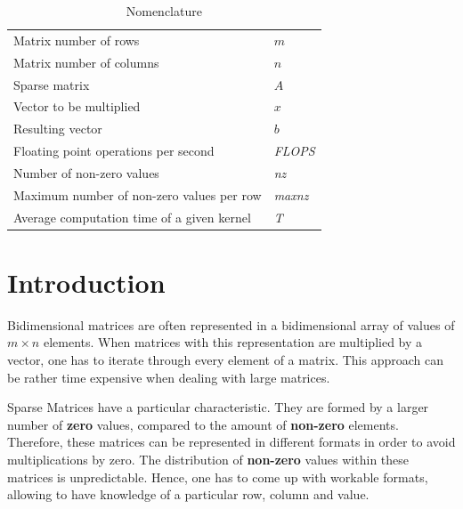 \documentclass[12pt]{article}
\begin{document}

\begin{table}[tb]
\caption{Nomenclature}
\label{tab:notation}
\centering
\def\arraystretch{1.5}
\begin{tabular}{ll}
Matrix number of rows & $m$\\
Matrix number of columns & $n$\\
Sparse matrix & $A$\\
Vector to be multiplied & $x$\\
Resulting vector & $b$\\
Floating point operations per second & \textit{FLOPS} \\
Number of non-zero values & \textit{nz} \\
Maximum number of non-zero values per row & \textit{maxnz} \\
Average computation time of a given kernel & \textit{T} \\
\end{tabular}
\end{table}


\section*{Introduction}

\par Bidimensional matrices are often represented in a bidimensional array of values of $m \times n$ elements. When matrices with this representation are multiplied by a vector, one has to iterate through every element of a matrix. This approach can be rather time expensive when dealing with large matrices.
\par Sparse Matrices have a particular characteristic. They are formed by a larger number of \textbf{zero} values, compared to the amount of \textbf{non-zero} elements. Therefore, these matrices can be represented in different formats in order to avoid multiplications by zero.\cite{sparse-gpu} The distribution of \textbf{non-zero} values within these matrices is unpredictable. Hence, one has to come up with workable formats, allowing to have knowledge of a particular row, column and value.
\end{document}
